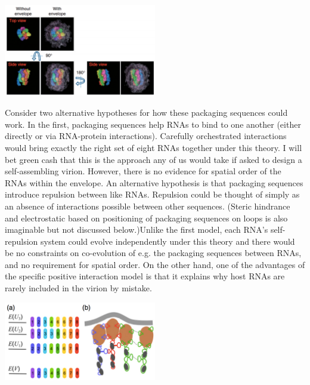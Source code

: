 \documentclass{article}
\begin{document}
\begin{center}
\includegraphics[width=0.5\textwidth]{noda.pdf}
\end{center}

Consider two alternative hypotheses for how these packaging sequences could work. In the first, packaging sequences help RNAs to bind to one another (either directly or via RNA-protein interactions). Carefully orchestrated interactions would bring exactly the right set of eight RNAs together under this theory. I will bet green cash that this is the approach any of us would take if asked to design a self-assembling virion. However, there is no evidence for spatial order of the RNAs within the envelope. An alternative hypothesis is that packaging sequences introduce repulsion between like RNAs. Repulsion could be thought of simply as an absence of interactions possible between other sequences. (Steric hindrance and electrostatic based on positioning of packaging sequences on loops is also imaginable but not discussed below.)Unlike the first model, each RNA's self-repulsion system could evolve independently under this theory and there would be no constraints on co-evolution of e.g. the packaging sequences between RNAs, and no requirement for spatial order. On the other hand, one of the advantages of the specific positive interaction model is that it explains why host RNAs are rarely included in the virion by mistake.

\begin{center}
\includegraphics[width=0.5\textwidth]{venev1.pdf}
\end{center}
\end{document}
